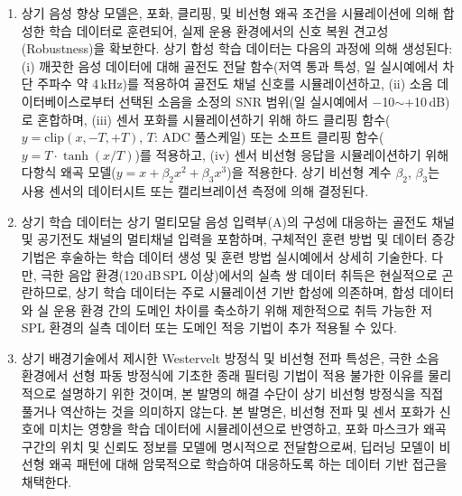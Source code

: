 \documentclass{article}
\begin{document}
\begin{enumerate}[label = \textbf{(B.3.\arabic*)}]

    \item 상기 음성 향상 모델은, 포화, 클리핑, 및 비선형 왜곡 조건을 시뮬레이션에 의해 합성한 학습 데이터로 훈련되어, 실제 운용 환경에서의 신호 복원 견고성(Robustness)을 확보한다. 상기 합성 학습 데이터는 다음의 과정에 의해 생성된다: (i) 깨끗한 음성 데이터에 대해 골전도 전달 함수(저역 통과 특성, 일 실시예에서 차단 주파수 약 4\,kHz)를 적용하여 골전도 채널 신호를 시뮬레이션하고, (ii) 소음 데이터베이스로부터 선택된 소음을 소정의 SNR 범위(일 실시예에서 $-$10$\sim$+10\,dB)로 혼합하며, (iii) 센서 포화를 시뮬레이션하기 위해 하드 클리핑 함수($y = \mathrm{clip}(x, -T, +T)$, $T$: ADC 풀스케일) 또는 소프트 클리핑 함수($y = T \cdot \tanh(x/T)$)를 적용하고, (iv) 센서 비선형 응답을 시뮬레이션하기 위해 다항식 왜곡 모델($y = x + \beta_2 x^2 + \beta_3 x^3$)을 적용한다. 상기 비선형 계수 $\beta_2$, $\beta_3$는 사용 센서의 데이터시트 또는 캘리브레이션 측정에 의해 결정된다.

    \item 상기 학습 데이터는 상기 멀티모달 음성 입력부(A)의 구성에 대응하는 골전도 채널 및 공기전도 채널의 멀티채널 입력을 포함하며, 구체적인 훈련 방법 및 데이터 증강 기법은 후술하는 학습 데이터 생성 및 훈련 방법 실시예에서 상세히 기술한다. 다만, 극한 음압 환경(120\,dB\,SPL 이상)에서의 실측 쌍 데이터 취득은 현실적으로 곤란하므로, 상기 학습 데이터는 주로 시뮬레이션 기반 합성에 의존하며, 합성 데이터와 실 운용 환경 간의 도메인 차이를 축소하기 위해 제한적으로 취득 가능한 저SPL 환경의 실측 데이터 또는 도메인 적응 기법이 추가 적용될 수 있다.

    \item 상기 배경기술에서 제시한 Westervelt 방정식 및 비선형 전파 특성은, 극한 소음 환경에서 선형 파동 방정식에 기초한 종래 필터링 기법이 적용 불가한 이유를 물리적으로 설명하기 위한 것이며, 본 발명의 해결 수단이 상기 비선형 방정식을 직접 풀거나 역산하는 것을 의미하지 않는다. 본 발명은, 비선형 전파 및 센서 포화가 신호에 미치는 영향을 학습 데이터에 시뮬레이션으로 반영하고, 포화 마스크가 왜곡 구간의 위치 및 신뢰도 정보를 모델에 명시적으로 전달함으로써, 딥러닝 모델이 비선형 왜곡 패턴에 대해 암묵적으로 학습하여 대응하도록 하는 데이터 기반 접근을 채택한다.

\end{enumerate}
\end{document}
